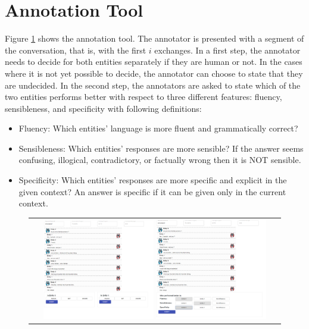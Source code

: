 \documentclass[11pt,a4paper]{article}
\begin{document}
\section{Annotation Tool}
Figure \ref{fig:tool} shows the annotation tool. The annotator is presented with a segment of the conversation, that is, with the first $i$ exchanges. In a first step, the annotator needs to decide for both entities separately if they are human or not. In the cases where it is not yet possible to decide, the annotator can choose to state that they are undecided. In the second step, the annotators are asked to state which of the two entities performs better with respect to three different features: fluency, sensibleness, and specificity with following definitions:
\begin{itemize}
    \item Fluency: Which entities' language is more fluent and grammatically correct?
    \item Sensibleness: Which entities' responses are more sensible? If the answer seems confusing, illogical, contradictory, or factually wrong then it is NOT sensible.
    \item Specificity: Which entities' responses are more specific and explicit in the given context? An answer is specific if it can be given only in the current context.
\end{itemize}

\label{sec:appendix}
\begin{figure}[!ht]
	\begin{center}
        \begin{tabular}{@{}c@{}}
		\includegraphics[width=0.45\textwidth]{figures/AnnotationTool1.png} 
		\includegraphics[width=0.45\textwidth]{figures/AnnotationTool2.png}
       \end{tabular}
	\end{center}\vspace{-3mm}
\label{fig:tool}
\end{figure}
\end{document}
